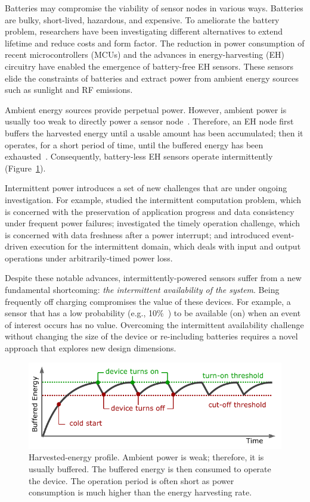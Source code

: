 Batteries may compromise the viability of sensor nodes in various ways. Batteries are bulky, short-lived, hazardous, and expensive. To ameliorate the battery problem, researchers have been investigating different alternatives to extend lifetime and reduce costs and form factor.  
The reduction in power consumption of recent microcontrollers (MCUs) and the advances in energy-harvesting (EH) circuitry have enabled the emergence of battery-free EH sensors. 
These sensors elide the constraints of batteries and extract power from ambient energy sources such as sunlight and RF emissions. 

Ambient energy sources provide perpetual power. However, ambient power is usually too weak to directly power a sensor node~\cite{liu2013ambient}.  Therefore, an EH  node first buffers the harvested energy until a usable amount has been accumulated; then it operates, for a short period of time, until the buffered energy has been exhausted~\cite{lucia2017intermittent}.  Consequently, battery-less EH sensors operate intermittently (Figure~\ref{fig:intermittent_opertaion}).

Intermittent power introduces a set of new challenges that are under ongoing investigation.
For example, \cite{lucia2017intermittent,ransford2011mementos,dino,colin2016chain,balsamo2014hibernus,rodriguez2018restop} studied the intermittent computation problem, which is concerned with the preservation of application progress and data consistency under frequent power failures; \citet{hester2017timely} investigated the timely operation challenge, which is concerned with data freshness after a power interrupt; 
and \citet{yildirim2018ink} introduced event-driven execution for the intermittent domain, which deals with input and output operations under arbitrarily-timed power loss.

Despite these notable advances, intermittently-powered sensors suffer from a new fundamental shortcoming: \textit{the intermittent availability of the system}. Being frequently off charging compromises the value of these devices. For example, a sensor that has a low probability (e.g., 10\%~\cite{coala}) to be available (on) when an event of interest occurs has no value. 
Overcoming the intermittent availability challenge without changing the size of the device or re-including batteries requires a novel approach that explores new design dimensions. 
%
\begin{figure}[b]
	\centering
		\includegraphics[width=\columnwidth]{figures/intermittent_operation}
		\caption{Harvested-energy profile. Ambient power is weak; therefore, it is usually buffered. The buffered energy is then consumed to operate the device. The operation period is often short as power consumption is much higher than the energy harvesting rate.}
		\label{fig:intermittent_opertaion}
\end{figure} 
%
